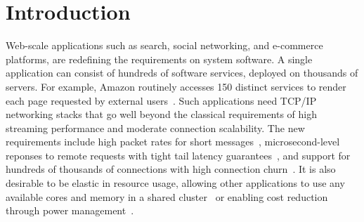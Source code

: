 
\section{Introduction}
\label{sec:intro}


Web-scale applications such as search, social networking, and
e-commerce platforms, are redefining the requirements on system
software. A single application can consist of hundreds of software
services, deployed on thousands of servers. For example, Amazon
routinely accesses 150 distinct services to render each page requested
by external users~\cite{DBLP:conf/sosp/DeCandiaHJKLPSVV07}. Such
applications need TCP/IP networking stacks that go well beyond the
classical requirements of high streaming performance and moderate
connection scalability. The new requirements include high packet rates
for short messages~\cite{Atikoglu:2012:WAL,missing-other},
microsecond-level reponses to remote requests with tight tail latency
guarantees~\cite{DBLP:journals/cacm/DeanB13}, and support for hundreds
of thousands of connections with high connection
churn~\cite{nishtala2013scaling,missing-other}. It is also desirable
to be elastic in resource usage, allowing other applications to use
any available cores and memory in a shared
cluster~\cite{nishtala2013scaling} or enabling cost reduction through
power management~\cite{DBLP:journals/computer/BarrosoH07}.



